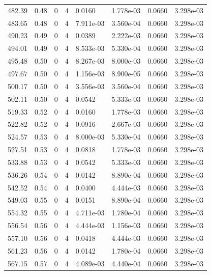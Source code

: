 \documentclass[preview]{standalone}
\begin{document}
{{{{\begin{tabular}{L{1.2cm}C{1.2cm} C{0.3cm}C{0.5cm} C{1.4cm}C{1.4cm} C{1.4cm}C{1.4cm}}
  482.39  &  0.48  & 0     &  4 &  0.0160  & 1.778e-03  & 0.0660 &  3.298e-03   \\ 
  483.65  &  0.48  & 0     &  4 &  7.911e-03  & 3.560e-04  & 0.0660 &  3.298e-03   \\ 
  490.23  &  0.49  & 0     &  4 &  0.0389  & 2.222e-03  & 0.0660 &  3.298e-03   \\ 
  494.01  &  0.49  & 0     &  4 &  8.533e-03  & 5.330e-04  & 0.0660 &  3.298e-03   \\ 
  495.48  &  0.50  & 0     &  4 &  8.267e-03  & 8.000e-03  & 0.0660 &  3.298e-03   \\ 
  497.67  &  0.50  & 0     &  4 &  1.156e-03  & 8.900e-05  & 0.0660 &  3.298e-03   \\ 
  500.17  &  0.50  & 0     &  4 &  3.556e-03  & 3.560e-04  & 0.0660 &  3.298e-03   \\ 
  502.11  &  0.50  & 0     &  4 &  0.0542  & 5.333e-03  & 0.0660 &  3.298e-03   \\ 
  519.33  &  0.52  & 0     &  4 &  0.0160  & 1.778e-03  & 0.0660 &  3.298e-03   \\ 
  522.82  &  0.52  & 0     &  4 &  0.0916  & 2.667e-03  & 0.0660 &  3.298e-03   \\ 
  524.57  &  0.53  & 0     &  4 &  8.000e-03  & 5.330e-04  & 0.0660 &  3.298e-03   \\ 
  527.51  &  0.53  & 0     &  4 &  0.0818  & 1.778e-03  & 0.0660 &  3.298e-03   \\ 
  533.88  &  0.53  & 0     &  4 &  0.0542  & 5.333e-03  & 0.0660 &  3.298e-03   \\ 
  536.26  &  0.54  & 0     &  4 &  0.0142  & 8.890e-04  & 0.0660 &  3.298e-03   \\ 
  542.52  &  0.54  & 0     &  4 &  0.0400  & 4.444e-03  & 0.0660 &  3.298e-03   \\ 
  549.03  &  0.55  & 0     &  4 &  0.0151  & 8.890e-04  & 0.0660 &  3.298e-03   \\ 
  554.32  &  0.55  & 0     &  4 &  4.711e-03  & 1.780e-04  & 0.0660 &  3.298e-03   \\ 
  556.54  &  0.56  & 0     &  4 &  4.444e-03  & 1.156e-03  & 0.0660 &  3.298e-03   \\ 
  557.10  &  0.56  & 0     &  4 &  0.0418  & 4.444e-03  & 0.0660 &  3.298e-03   \\ 
  561.23  &  0.56  & 0     &  4 &  0.0142  & 1.780e-04  & 0.0660 &  3.298e-03   \\ 
  567.15  &  0.57  & 0     &  4 &  4.089e-03  & 4.440e-04  & 0.0660 &  3.298e-03   \\ 

\end{tabular}}}}}
\end{document}
